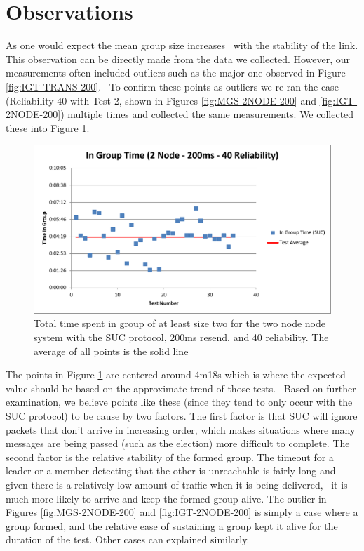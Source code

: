 \documentclass{llncs}
\begin{document}
\section{Observations}

As one would expect the mean group size increases  with the stability of the link. This observation can be directly made from the data we collected. However, our measurements often included outliers such as the major one observed in Figure \ref{fig:IGT-TRANS-200}.  To confirm these points as outliers we re-ran the case (Reliability 40 with Test 2, shown in Figures \ref{fig:MGS-2NODE-200} and \ref{fig:IGT-2NODE-200}) multiple times and collected the same measurements. We collected these into Figure \ref{fig:rerun}.

\begin{figure}[!h]
\centering
\includegraphics[width=.74\textwidth]{2NODE40RELIABILITY.pdf}
\caption{Total time spent in group of at least size two for the two node node system with the SUC protocol, 200ms resend, and 40 reliability. The average of all points is the solid line}
\label{fig:rerun}
\end{figure}

The points in Figure \ref{fig:rerun} are centered around 4m18s which is where the expected value should be based on the approximate trend of those tests.  Based on further examination, we believe points like these (since they tend to only occur with the SUC protocol) to be cause by two factors. The first factor is that SUC will ignore packets that don't arrive in increasing order, which makes situations where many messages are being passed (such as the election) more difficult to complete. The second factor is the relative stability of the formed group. The timeout for a leader or a member detecting that the other is unreachable is fairly long and given there is a relatively low amount of traffic when it is being delivered,  it is much more likely to arrive and keep the formed group alive. The outlier in Figures \ref{fig:MGS-2NODE-200} and \ref{fig:IGT-2NODE-200} is simply a case where a group formed, and the relative ease of sustaining a group kept it alive for the duration of the test. Other cases can explained similarly.
\end{document}
